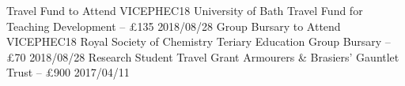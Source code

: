 \begin{cvpubs}
  \cvpub
    {Travel Fund to Attend VICEPHEC18}
    {University of Bath Travel Fund for Teaching Development -- £135}
    {2018/08/28}
  \cvpub
    {Group Bursary to Attend VICEPHEC18}
    {Royal Society of Chemistry Teriary Education Group Bursary -- £70}
    {2018/08/28}
  \cvpub
  	{Research Student Travel Grant}
    {Armourers \& Brasiers' Gauntlet Trust -- £900}
    {2017/04/11}
\end{cvpubs}
